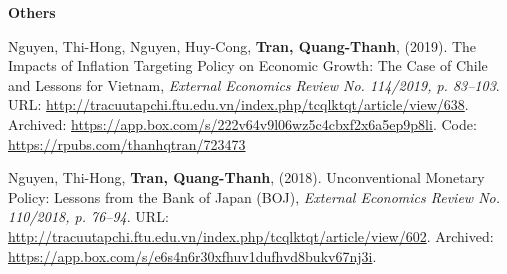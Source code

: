 {\bf Others}
\vspace*{.05in}
\begin{etaremune}[]

	\item
	Nguyen, Thi-Hong,
	Nguyen, Huy-Cong,
	{\bf Tran, Quang-Thanh},
	(2019).
	{The Impacts of Inflation Targeting Policy on Economic Growth: The Case of Chile and Lessons for Vietnam},
	{\it External Economics Review No. 114/2019, p. 83--103}.
	{URL: \url{http://tracuutapchi.ftu.edu.vn/index.php/tcqlktqt/article/view/638}}.
	{Archived: \url{https://app.box.com/s/222v64v9l06wz5c4cbxf2x6a5ep9p8li}. Code: \url{https://rpubs.com/thanhqtran/723473}}

	\item 
	Nguyen, Thi-Hong,
	{\bf Tran, Quang-Thanh},
	(2018).
	Unconventional Monetary Policy: Lessons from the Bank of Japan (BOJ),
	{\it External Economics Review No. 110/2018, p. 76--94}.
	{URL: \url{http://tracuutapchi.ftu.edu.vn/index.php/tcqlktqt/article/view/602}}. 
	{Archived: \url{https://app.box.com/s/e6s4n6r30xfhuv1dufhvd8bukv67nj3i}}.
\end{etaremune}


